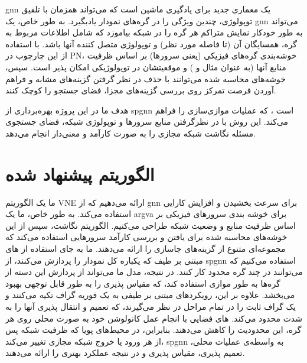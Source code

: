   \gls{gnn}
  \cite {graph_nn}
  یک معماری جدید برای یادگیری ماشین است که ‌می‌تواند همزمان با تلفیق توپولوژی، چندین ویژگی را در گره‌های نمودار یاد‌بگیرد.
%  
  به طور خاص، یک \gls{gnn} ‌می‌تواند به طور خودکار نمایش متراکم هر گره را در شبکه بیاموزد که شامل اطلاعات مربوط به گره، همسایگان آن (تا فاصله مورد نظر) و توپولوژی متصل کننده آنها باشد.
%
  با استفاده از این چارچوب در PN، 
  \gls{خوشه‌بندی}
   گره‌های فیزیکی (یعنی سرورها) بر اساس ظرفیت منابع آنها (به عنوان مثال
     و
      ) و موقعیتشان در توپولوژیکی امکان پذیر است.
%
  سپس، خوشه‌های محاسبه شده ‌می‌توانند با حذف در نظر گرفتن گزینه‌های مشابه و فراهم آوردن فرصت تمرکز روی بررسی گزینه‌های مجزا، فضای جستجو را کوچک کنند.
  
  هدف ما در این پروژه بهره‌برداری از \gls{spgnn} است
   \cite {graphSage,argva} 
، که عملیات موازی‌سازی را فراهم ‌می‌کند. این روش  با در نظرگرفتن منابع سرور‌ها و توپولوژی شبکه، فضای جستجوی مسئله نگاشت شبکه مجازی را به صورت کارآمد و معنی‌دار انجام می‌دهد.
 
\section{الگوریتم پیشنهاد شده}

ما یک الگوریتم VNE ارائه ‌می‌دهیم که از \gls{gnn} برای سرعت بخشیدن و افزایش کارایی استفاده ‌می‌کند.
%
به طور خاص، ما یک \gls{argva} برای خوشه بندی سرورهای فیزیکی بر اساس ظرفیت منابع و وضعیت شبکه طراحی ‌می‌کنیم.
%
الگوریتم نگاشت، سپس از این خوشه‌های محاسبه شده برای یافتن و بررسی کارآمد سرورهایی استفاده می‌کند که مجموعه‌ای متنوع از گزینه‌های جاسازی را ارائه ‌می‌دهند.
%
ما به جای استفاده از های مبتنی بر طیف
 \cite {graphNN_RL}
که یکباره کل نمودار را پردازش ‌می‌کنند، از \gls{spgnn} استفاده ‌می‌کنیم که ‌می‌توانند در چند گره  محدود کار کنند.
%
در نتیجه، مدل ما می‌تواند از پردازش این دسته از گره‌ها به طور موازی استفاده کند، که مقیاس پذیری را به طور قابل توجهی بهبود می‌بخشد.
%
علاوه بر این، رویکردهای مبتنی بر طیفی به یک فوریه گراف تکیه می‌کنند و یک گراف ثابت را  در تمام مراحل در نظر می‌گیرند، که تعمیم و انتقال پذیری آنها را به شدت محدود ‌می‌کند. های فضایی با انجام عمل کانولوشن خود به صورت محلی روی هر گره، این محدودیت را کاهش ‌می‌دهند. بنابراین، در محیط‌های پویا که ظرفیت شبکه پس از هر ورود یا خروج شبکه مجازی تغییر ‌می‌کند، \gls{spgnn} به واسطه‌ی عملیات محلی، تعمیم پذیری، مقیاس پذیری و در نتیجه عملکرد بهتری را ارائه ‌می‌دهند.

